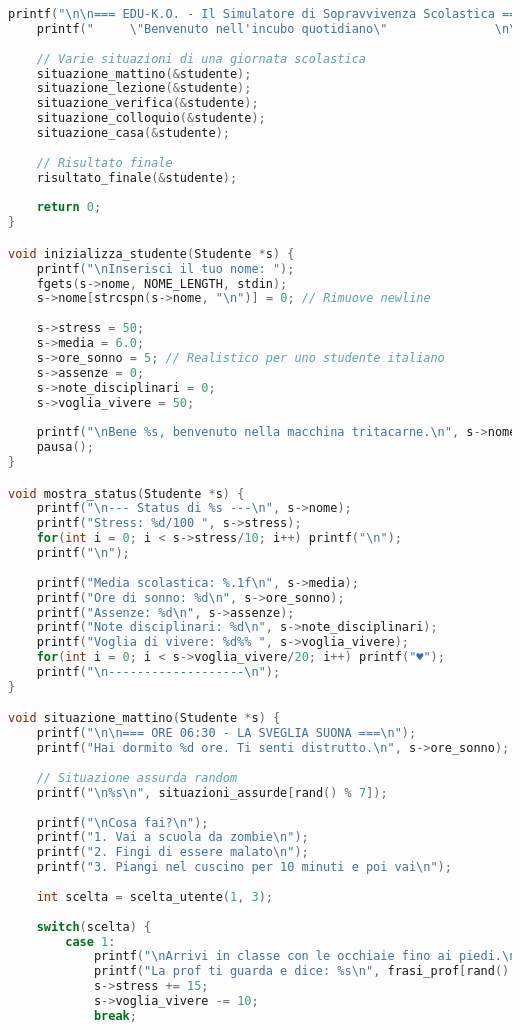 \documentclass[a4paper,12pt]{article}
\begin{document}
\begin{lstlisting}[language=C, caption=Codice completo (file Capolavoro2.c)]
    printf("\n\n=== EDU-K.O. - Il Simulatore di Sopravvivenza Scolastica ===\n");
    printf("     \"Benvenuto nell'incubo quotidiano\"               \n\n");
    
    // Varie situazioni di una giornata scolastica
    situazione_mattino(&studente);
    situazione_lezione(&studente);
    situazione_verifica(&studente);
    situazione_colloquio(&studente);
    situazione_casa(&studente);
    
    // Risultato finale
    risultato_finale(&studente);
    
    return 0;
}

void inizializza_studente(Studente *s) {
    printf("\nInserisci il tuo nome: ");
    fgets(s->nome, NOME_LENGTH, stdin);
    s->nome[strcspn(s->nome, "\n")] = 0; // Rimuove newline
    
    s->stress = 50;
    s->media = 6.0;
    s->ore_sonno = 5; // Realistico per uno studente italiano
    s->assenze = 0;
    s->note_disciplinari = 0;
    s->voglia_vivere = 50;
    
    printf("\nBene %s, benvenuto nella macchina tritacarne.\n", s->nome);
    pausa();
}

void mostra_status(Studente *s) {
    printf("\n--- Status di %s ---\n", s->nome);
    printf("Stress: %d/100 ", s->stress);
    for(int i = 0; i < s->stress/10; i++) printf("\n");
    printf("\n");
    
    printf("Media scolastica: %.1f\n", s->media);
    printf("Ore di sonno: %d\n", s->ore_sonno);
    printf("Assenze: %d\n", s->assenze);
    printf("Note disciplinari: %d\n", s->note_disciplinari);
    printf("Voglia di vivere: %d%% ", s->voglia_vivere);
    for(int i = 0; i < s->voglia_vivere/20; i++) printf("♥");
    printf("\n-------------------\n");
}

void situazione_mattino(Studente *s) {
    printf("\n\n=== ORE 06:30 - LA SVEGLIA SUONA ===\n");
    printf("Hai dormito %d ore. Ti senti distrutto.\n", s->ore_sonno);
    
    // Situazione assurda random
    printf("\n%s\n", situazioni_assurde[rand() % 7]);
    
    printf("\nCosa fai?\n");
    printf("1. Vai a scuola da zombie\n");
    printf("2. Fingi di essere malato\n");
    printf("3. Piangi nel cuscino per 10 minuti e poi vai\n");
    
    int scelta = scelta_utente(1, 3);
    
    switch(scelta) {
        case 1:
            printf("\nArrivi in classe con le occhiaie fino ai piedi.\n");
            printf("La prof ti guarda e dice: %s\n", frasi_prof[rand() % 8]);
            s->stress += 15;
            s->voglia_vivere -= 10;
            break;
            

\end{lstlisting}
\end{document}
